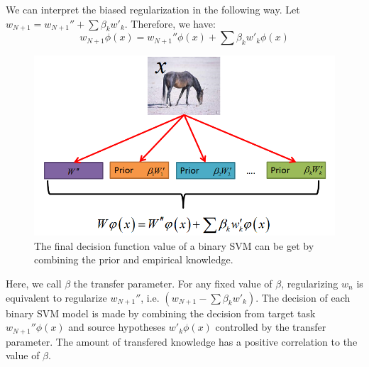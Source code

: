 We can interpret the biased regularization in the following way. Let $w_{N+1} = w_{N+1}''+\sum\limits{\beta _kw'_k}$. Therefore, we have:
\begin{equation*}
w_{N+1}\phi(x)=w_{N+1}''\phi(x)+\sum\limits{\beta _kw'_k\phi(x)}
\end{equation*}

\begin{figure}
\centering
\includegraphics[scale=0.3]{fig/combine.png}
\caption{The final decision function value of a binary SVM can be get by combining the prior and empirical knowledge.}
\end{figure}
Here, we call $\beta$ the transfer parameter. For any fixed value of $\beta$, regularizing $w_n$ is equivalent to regularize $w_{N+1}''$, i.e. $(w_{N+1}-\sum\limits{\beta _kw'_k})$. The decision of each binary SVM model is made by combining the decision from target task $w_{N+1}''\phi(x)$ and source hypotheses $w'_k\phi(x)$ controlled by the transfer parameter. The amount of transfered knowledge has a positive correlation to the value of $\beta$.